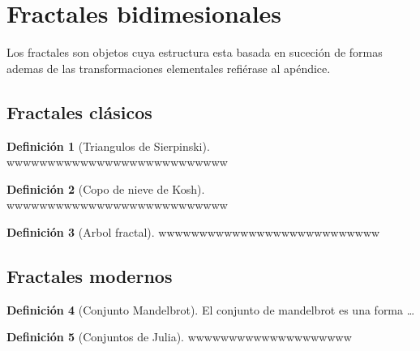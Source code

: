 \documentclass[16pt,]{krantz}
\theoremstyle{definition}
\newtheorem{definition}{Definición}[chapter]
\theoremstyle{definition}
\theoremstyle{definition}
\theoremstyle{definition}
\theoremstyle{remark}
\begin{document}
\hypertarget{fractales-bidimesionales}{%
\section{Fractales bidimesionales}\label{fractales-bidimesionales}}

Los fractales son objetos cuya estructura esta basada en suceción de formas ademas de las transformaciones elementales refiérase al apéndice.

\hypertarget{fractales-cluxe1sicos}{%
\subsection{Fractales clásicos}\label{fractales-cluxe1sicos}}

\begin{definition}[Triangulos de Sierpinski]
\protect\hypertarget{def:sierpinski}{}{\label{def:sierpinski} {} }wwwwwwwwwwwwwwwwwwwwwwwwwww
\end{definition}

\begin{definition}[Copo de nieve de Kosh]
\protect\hypertarget{def:kosh}{}{\label{def:kosh} {} }wwwwwwwwwwwwwwwwwwwwwwwwwww
\end{definition}

\begin{definition}[Arbol fractal]
\protect\hypertarget{def:arbol}{}{\label{def:arbol} {} }wwwwwwwwwwwwwwwwwwwwwwwwwww
\end{definition}

\hypertarget{fractales-modernos}{%
\subsection{Fractales modernos}\label{fractales-modernos}}

\begin{definition}[Conjunto Mandelbrot]
\protect\hypertarget{def:mmandelbrot}{}{\label{def:mmandelbrot} {} }El conjunto de mandelbrot es una forma \ldots{}
\end{definition}

\begin{definition}[Conjuntos de Julia]
\protect\hypertarget{def:julia}{}{\label{def:julia} {} }wwwwwwwwwwwwwwwwwwww
\end{definition}
\end{document}
